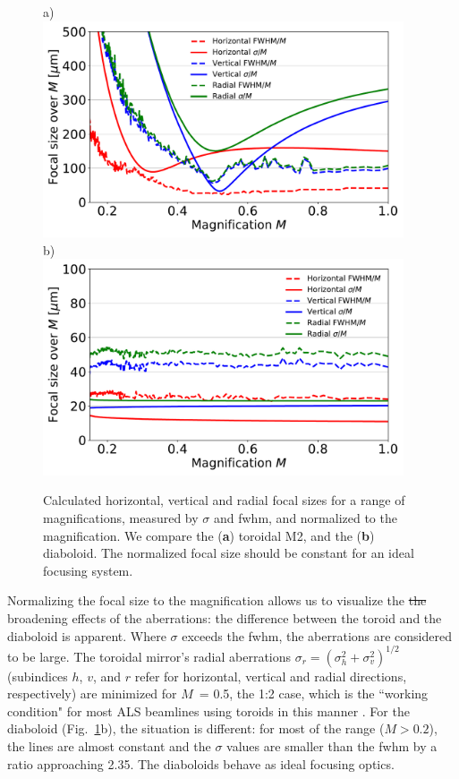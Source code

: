 \documentclass[preprint]{iucr}       %
\newcommand{\inred}[1]{{\color{red}#1}}
\begin{document}
\begin{figure}\label{fig:scan}
\flushleft
a)\\
\centering
\includegraphics[width=0.95\textwidth]{figures/scan_toroid.pdf}\\
\flushleft
b)\\
\centering
\includegraphics[width=0.95\textwidth]{figures/scan_diaboloid.pdf}\\
\caption{Calculated horizontal, vertical and radial focal sizes for a range of magnifications, measured by $\sigma$ and fwhm, and normalized to the magnification. We compare the (\textbf{a}) toroidal M2, and the (\textbf{b}) diaboloid. The normalized focal size should be constant for an ideal focusing system.}
\end{figure}

Normalizing the focal size to the magnification allows us to visualize the \inred{\sout{the}} broadening effects of the aberrations: the difference between the toroid and the diaboloid is apparent. Where $\sigma$ exceeds the fwhm, the aberrations are considered to be large. The toroidal mirror's radial aberrations $\sigma_r = (\sigma_h^2 + \sigma_v^2)^{1/2}$ (subindices $h$, $v$, and $r$ refer for horizontal, vertical and radial directions, respectively) are minimized for $M$~= 0.5, the 1:2 case, which is the ``working condition" for most ALS beamlines using toroids in this manner \cite{MacDowell2004}. For the diaboloid (Fig.~\ref{fig:scan}b), the situation is different: for most of the range ($M > 0.2$), the lines are almost constant and the $\sigma$ values are smaller than the fwhm by a ratio approaching 2.35. The diaboloids behave as ideal focusing optics.
\end{document}
